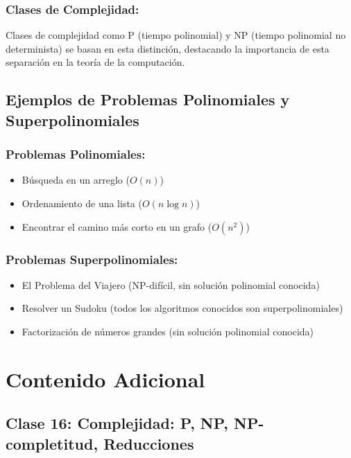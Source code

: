 \documentclass[12pt]{article}
\begin{document}
    \subsubsection{Clases de Complejidad:}
    Clases de complejidad como P (tiempo polinomial) y NP (tiempo polinomial no determinista) se basan en esta distinción, destacando la importancia de esta separación en la teoría de la computación.

	\subsection{Ejemplos de Problemas Polinomiales y Superpolinomiales}

    \subsubsection{Problemas Polinomiales:}
    \begin{itemize}
        \item Búsqueda en un arreglo ($O(n)$)
        \item Ordenamiento de una lista ($O(n \log n)$)
        \item Encontrar el camino más corto en un grafo ($O(n^2)$)
    \end{itemize}

    \subsubsection{Problemas Superpolinomiales:}
    \begin{itemize}
        \item El Problema del Viajero (NP-difícil, sin solución polinomial conocida)
        \item Resolver un Sudoku (todos los algoritmos conocidos son superpolinomiales)
        \item Factorización de números grandes (sin solución polinomial conocida)
    \end{itemize}

	\section{Contenido Adicional}

    \subsection{Clase 16: Complejidad: P, NP, NP-completitud, Reducciones \cite{demaine2015complexity}}
\end{document}
